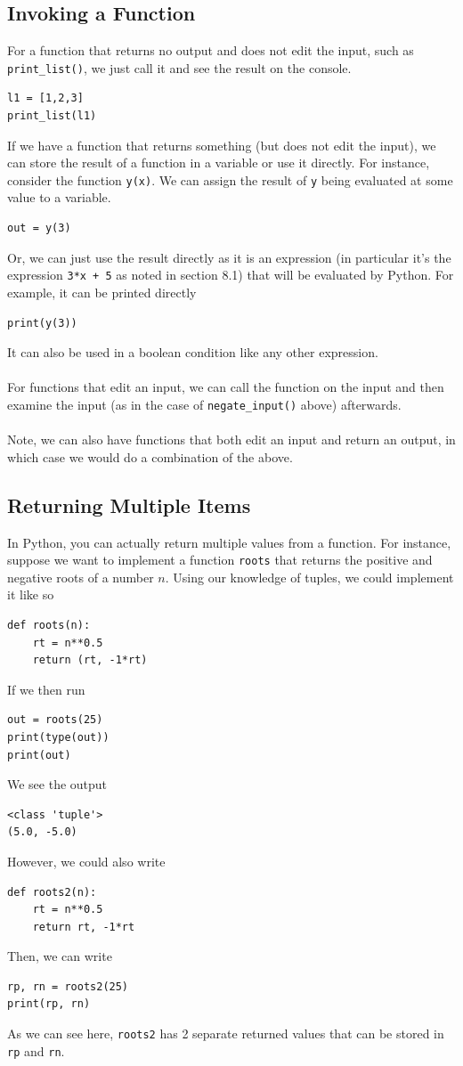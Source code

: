 \documentclass{article}
\begin{document}
\subsection{Invoking a Function}
For a function that returns no output and does not edit the input, such as \texttt{print\_list()}, we just call it and see the result on the console.
\begin{verbatim}
l1 = [1,2,3]
print_list(l1)
\end{verbatim}
If we have a function that returns something (but does not edit the input), we can store the result of a function in a variable or use it directly. For instance, consider the function \texttt{y(x)}. We can assign the result of \texttt{y} being evaluated at some value to a variable.
\begin{verbatim}
out = y(3)
\end{verbatim}
Or, we can just use the result directly as it is an expression (in particular it's the expression \texttt{3*x + 5} as noted in section 8.1) that will be evaluated by Python. For example, it can be printed directly
\begin{verbatim}
print(y(3))
\end{verbatim}
It can also be used in a boolean condition like any other expression.\\\\
For functions that edit an input, we can call the function on the input and then examine the input (as in the case of \texttt{negate\_input()} above) afterwards.\\\\
Note, we can also have functions that both edit an input and return an output, in which case we would do a combination of the above.

\subsection{Returning Multiple Items}
In Python, you can actually return multiple values from a function. For instance, suppose we want to implement a function \texttt{roots} that returns the positive and negative roots of a number $n$. Using our knowledge of tuples, we could implement it like so
\begin{verbatim}
def roots(n):
    rt = n**0.5
    return (rt, -1*rt)
\end{verbatim}
If we then run
\begin{verbatim}
out = roots(25)
print(type(out))
print(out)
\end{verbatim}
We see the output
\begin{verbatim}
<class 'tuple'>
(5.0, -5.0)
\end{verbatim}
However, we could also write
\begin{verbatim}
def roots2(n):
    rt = n**0.5
    return rt, -1*rt
\end{verbatim}
Then, we can write
\begin{verbatim}
rp, rn = roots2(25)
print(rp, rn)
\end{verbatim}
As we can see here, \texttt{roots2} has 2 separate returned values that can be stored in \texttt{rp} and \texttt{rn}.
\end{document}
